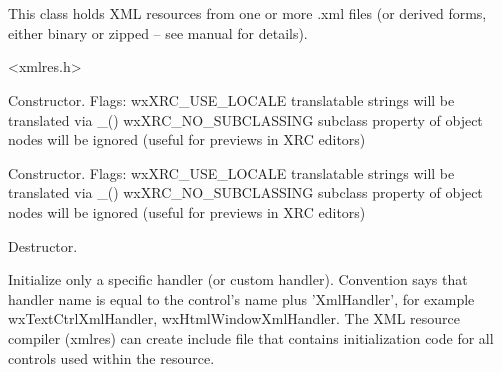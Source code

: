 %
%


\section{}\label{wxxmlresource}


This class holds XML resources from one or more .xml files
(or derived forms, either binary or zipped -- see manual for
details).




<xmlres.h>




\label{wxxmlresourcewxxmlresource}


Constructor.
Flags: wxXRC\_USE\_LOCALE
translatable strings will be translated via \_()
wxXRC\_NO\_SUBCLASSING
subclass property of object nodes will be ignored
(useful for previews in XRC editors)



Constructor.
Flags: wxXRC\_USE\_LOCALE
translatable strings will be translated via \_()
wxXRC\_NO\_SUBCLASSING
subclass property of object nodes will be ignored
(useful for previews in XRC editors)


\label{wxxmlresourcedtor}


Destructor.


\label{wxxmlresourceaddhandler}


Initialize only a specific handler (or custom handler). Convention says
that handler name is equal to the control's name plus 'XmlHandler', for example
wxTextCtrlXmlHandler, wxHtmlWindowXmlHandler. The XML resource compiler
(xmlres) can create include file that contains initialization code for
all controls used within the resource.


